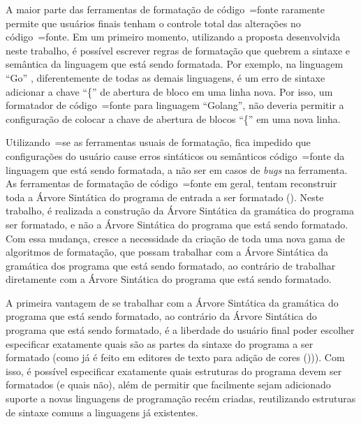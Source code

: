 {    A maior parte das ferramentas de formatação de código~=fonte raramente permite que usuários finais tenham o controle total das alterações no código~=fonte.
    Em um primeiro momento,
    utilizando a proposta desenvolvida neste trabalho,
    é possível escrever regras de formatação que quebrem a sintaxe e
    semântica da linguagem que está sendo formatada.
    Por exemplo,
    na linguagem ``Go'' \cite{programmingLanguageGolang},
    diferentemente de todas as demais linguagens,
    é um erro de sintaxe adicionar a chave ``\{'' de abertura de bloco em uma linha nova.
    Por isso,
    um formatador de código~=fonte para linguagem ``Golang'',
    não deveria permitir a configuração de colocar a chave de abertura de blocos ``\{'' em uma nova linha.

    Utilizando~=se as ferramentas usuais de formatação,
    fica impedido que configurações do usuário cause erros sintáticos ou
    semânticos código~=fonte da linguagem que está sendo formatada,
    a não ser em casos de \textit{bugs} na ferramenta.
    As ferramentas de formatação de código~=fonte em geral,
    tentam reconstruir toda a Árvore Sintática do programa de entrada a ser formatado ().
    Neste trabalho,
    é realizada a construção da Árvore Sintática da gramática do programa ser formatado,
    e não a Árvore Sintática do programa que está sendo formatado.
    Com essa mudança,
    cresce a necessidade da criação de toda uma nova gama de algoritmos de formatação,
    que possam trabalhar com a Árvore Sintática da gramática dos programa que está sendo formatado,
    ao contrário de trabalhar diretamente com a Árvore Sintática do programa que está sendo formatado.

    A primeira vantagem de se trabalhar com a Árvore Sintática da gramática do programa que está sendo formatado,
    ao contrário da Árvore Sintática do programa que está sendo formatado,
    é a liberdade do usuário final poder escolher especificar exatamente quais são as partes da sintaxe do programa a ser formatado (como já é feito em editores de texto para adição de cores ())).
    Com isso,
    é possível especificar exatamente quais estruturas do programa devem ser formatados (e quais não),
    além de permitir que facilmente sejam adicionado suporte a novas linguagens de programação recém criadas,
    reutilizando estruturas de sintaxe comuns a linguagens já existentes.

}
